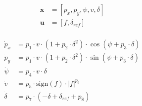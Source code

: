 \begin{align}
\boldsymbol{x} &= [p_x, p_y, \psi, v, \delta] \\
\boldsymbol{u} &= [f, \delta_{ref}] \\
\end{align}

\begin{align}
\dot{p}_x &= p_1 \cdot v \cdot (1+p_2 \cdot \delta^2) \cdot \cos(\psi + p_3 \cdot \delta) \\
\dot{p}_y &= p_1 \cdot v \cdot (1+p_2 \cdot \delta^2) \cdot \sin(\psi + p_3 \cdot \delta) \\
\dot{\psi} &= p_4 \cdot v \cdot \delta \\
\dot{v} &= p_5 \cdot \text{sign}(f) \cdot |f|^{p_6} \\
\dot{\delta} &= p_7 \cdot (-\delta + \delta_{ref} + p_8)
\end{align}